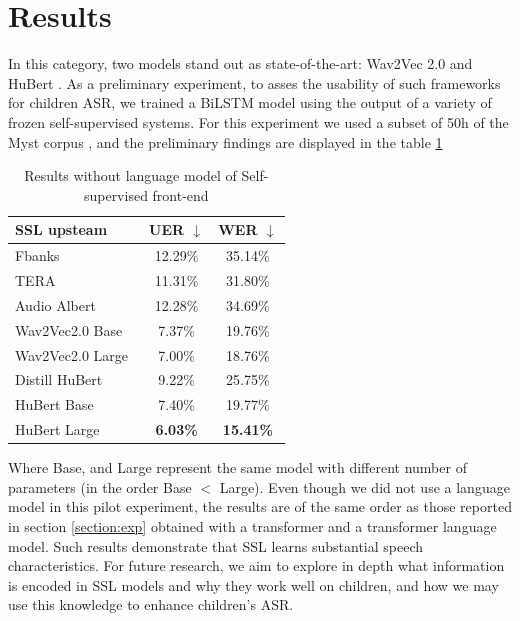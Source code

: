 \section{Results}


In this category, two models stand out as state-of-the-art: Wav2Vec 2.0 \cite{baevski2020wav2vec} and HuBert \cite{hsu2021hubert}. As a preliminary experiment, to asses the usability of such frameworks for children ASR, we trained a BiLSTM model using the output of a variety of frozen self-supervised systems. For this experiment we used a subset of 50h of the Myst corpus \cite{MyST}, and the preliminary findings are displayed in the table \ref{tab:ssl}
\begin{table}[ht]
\centering
\begin{tabular}{lcc} 
\hline
SSL upsteam & UER $\downarrow$ & WER $\downarrow$ \\ 
\hline
Fbanks & 12.29\% & 35.14\% \\ 
\hline
TERA \cite{tera} & 11.31\% & 31.80\% \\
Audio Albert \cite{chi2021audio} & 12.28\% & 34.69\% \\
Wav2Vec2.0 Base & 7.37\% & 19.76\% \\
Wav2Vec2.0 Large~ & 7.00\% & 18.76\% \\
Distill HuBert \cite{chang2022distilhubert} & 9.22\% & 25.75\% \\
HuBert Base & 7.40\% & 19.77\% \\
HuBert Large & \textbf{6.03\%} & \textbf{15.41\%} \\
\hline
\end{tabular}
\caption{Results without language model of Self-supervised front-end}
\label{tab:ssl}
\end{table}

Where Base, and Large represent the same model with different number of parameters (in the order Base $<$ Large).
Even though we did not use a language model in this pilot experiment, the results are of the same order as those reported in section \ref{section:exp} obtained with a transformer and a transformer language model. Such results demonstrate that SSL learns substantial speech characteristics. For future research, we aim to explore in depth what information is encoded in SSL models and why they work well on children, and how we may use this knowledge to enhance children's ASR.
